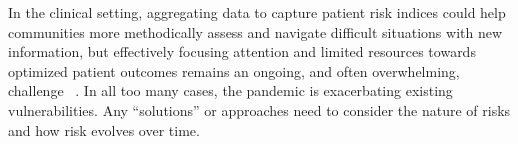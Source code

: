In the clinical setting, aggregating data to capture patient risk indices could help communities more methodically assess and navigate difficult situations with new information, but effectively focusing attention and limited resources towards optimized patient outcomes remains an ongoing, and often overwhelming, challenge ~\cite{zhou2020clinical, onder2020case}. In all too many cases, the pandemic is exacerbating existing vulnerabilities. Any “solutions” or approaches need to consider the nature of risks and how risk evolves over time.  
